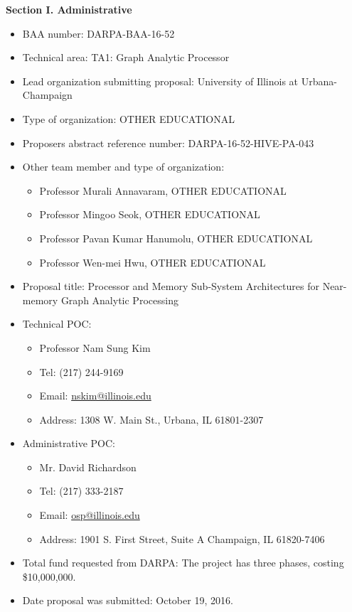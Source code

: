 \documentclass[12pt]{article}
\makeatletter
\renewcommand\section{\@startsection {section}{1}{\z@}%
   {-3ex \@plus -1ex \@minus -.2ex}%
   {1.7ex \@plus.2ex}%
   {\normalfont\large\bfseries}}
\makeatother
\begin{document}
\thispagestyle{empty}

\begin{comment}
\vspace{-0.2in}
\section{Statement of Work}

\newpage
\end{comment}

\noindent 
{\large \bfseries Section I. Administrative}

\begin{itemize}
\item BAA number: DARPA-BAA-16-52
\item Technical area: TA1: Graph Analytic Processor
\item Lead organization submitting proposal: University of Illinois at Urbana-Champaign
\item Type of organization: OTHER EDUCATIONAL
\item Proposers abstract reference number: DARPA-16-52-HIVE-PA-043
\item Other team member and type of organization: 
\begin{itemize}
\item Professor Murali Annavaram, OTHER EDUCATIONAL
\item Professor Mingoo Seok, OTHER EDUCATIONAL
\item Professor Pavan Kumar Hanumolu, OTHER EDUCATIONAL
\item Professor Wen-mei Hwu, OTHER EDUCATIONAL
\end{itemize}
\item Proposal title: Processor and Memory Sub-System Architectures for Near-memory Graph Analytic Processing
\item Technical POC: 
\begin{itemize}
\item Professor Nam Sung Kim
\item Tel: (217) 244-9169
\item Email: \url{nskim@illinois.edu}
\item Address: 1308 W. Main St., Urbana, IL 61801-2307
\end{itemize}
\item Administrative POC: 
\begin{itemize}
\item Mr. David Richardson
\item Tel: (217) 333-2187
\item Email: \url{osp@illinois.edu}
\item Address: 1901 S. First Street, Suite A Champaign, IL 61820-7406
\end{itemize}
\item Total fund requested from DARPA: The project has three phases, costing \$10,000,000.
\item Date proposal was submitted: October 19, 2016.
\end{itemize}
\end{document}
